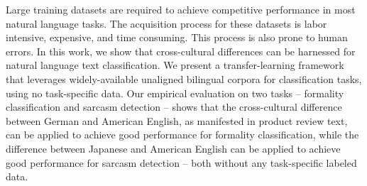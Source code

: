 Large training datasets are required to achieve competitive performance in most natural language tasks.
The acquisition process for these datasets is labor intensive, expensive, and time consuming. This process is also prone to human errors.
In this work, we show that cross-cultural differences can be harnessed for natural language text classification.
We present a transfer-learning framework that leverages widely-available unaligned bilingual corpora for classification tasks, using no task-specific data. 
Our empirical evaluation on two tasks -- formality classification and sarcasm detection -- shows that the cross-cultural difference between German and American English, as manifested in product review text, can be applied to achieve good performance for formality classification, while the difference between Japanese and American English can be applied to achieve good performance for sarcasm detection -- both without any task-specific labeled data.